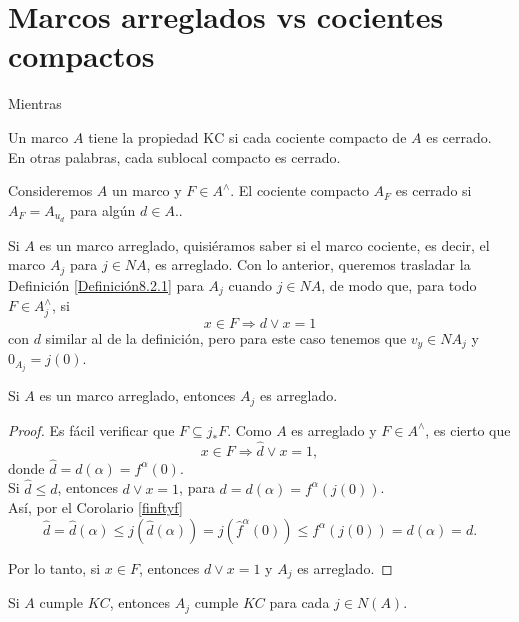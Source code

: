 \chapter{Marcos arreglados vs cocientes compactos}\label{MarcosKC}

Mientras

\begin{dfn}\label{KOMPACT}
	Un marco $A$ tiene la propiedad $\mathrm{KC}$ si cada cociente compacto de $A$ es cerrado. En otras palabras, cada sublocal compacto es cerrado.
\end{dfn}

\begin{dfn}\label{ccquotien}
    Consideremos $A$ un marco y $F\in A^\wedge$. El cociente compacto $A_F$ es cerrado si $A_F=A_{u_d}$ para algún $d\in A$..
\end{dfn}

Si $A$ es un marco arreglado, quisiéramos saber si el marco cociente, es decir, el marco $A_j$ para $j\in NA$, es arreglado.
Con lo anterior, queremos trasladar la Definición \ref{Definición8.2.1} para $A_j$ cuando $j\in NA$, de modo que, para todo $F\in A_j^\wedge$, si
\[
x\in F \Rightarrow d\vee x=1
\]
con $d$ similar al de la definición, pero para este caso tenemos que $v_y\in NA_j$ y $0_{A_j}=j(0)$.

\begin{prop}\label{tidyquout}
    Si $A$ es un marco arreglado, entonces $A_j$ es arreglado.
\end{prop}

\begin{proof}
Es fácil verificar que $F\subseteq j_*F$. Como $A$ es arreglado y $F\in A^\wedge$, es cierto que 
\[
x\in F\Rightarrow \hat{d}\vee x=1,
\]
donde $\hat{d}=d(\alpha)=f^\alpha(0)$.\\
Si $\hat{d}\leq d$, entonces $d\vee x=1$, para $d=d(\alpha)=f^\alpha(j(0))$.\\

Así, por el Corolario \ref{finftyf}
\[
\hat{d}=\hat{d}(\alpha)\leq j(\hat{d}(\alpha))=j(\hat{f}^\alpha(0))\leq f^\alpha(j(0))=d(\alpha)=d.
\]

Por lo tanto, si $x\in F$, entonces $d\vee x=1$ y $A_j$ es arreglado.
\end{proof}

\begin{prop}\label{KCquout}
    Si $A$ cumple $KC$, entonces $A_j$ cumple $KC$ para cada $j\in N(A).$
\end{prop}

